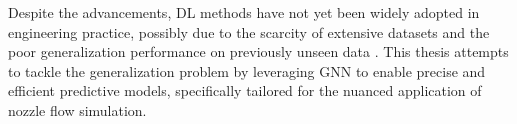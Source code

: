 Despite the advancements, DL methods have not yet been widely adopted in engineering practice, possibly due to the scarcity of extensive datasets and the poor generalization performance on previously unseen data \cite{brenner2019perspective}. This thesis attempts to tackle the generalization problem by leveraging \gls{GNN} to enable precise and efficient predictive models, specifically tailored for the nuanced application of nozzle flow simulation.
